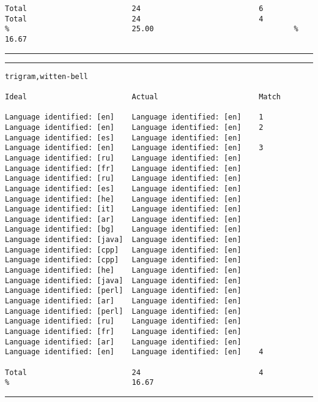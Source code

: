 \begin{verbatim}
Total                        24                           6       Total                        24                           4
%                            25.00                                %                            16.67
\end{verbatim}
\vskip4pt\hrule

\clearpage

\tiny
\hrule\vskip4pt
\begin{verbatim}
trigram,witten-bell

Ideal                        Actual                       Match

Language identified: [en]    Language identified: [en]    1
Language identified: [en]    Language identified: [en]    2
Language identified: [es]    Language identified: [en]
Language identified: [en]    Language identified: [en]    3
Language identified: [ru]    Language identified: [en]
Language identified: [fr]    Language identified: [en]
Language identified: [ru]    Language identified: [en]
Language identified: [es]    Language identified: [en]
Language identified: [he]    Language identified: [en]
Language identified: [it]    Language identified: [en]
Language identified: [ar]    Language identified: [en]
Language identified: [bg]    Language identified: [en]
Language identified: [java]  Language identified: [en]
Language identified: [cpp]   Language identified: [en]
Language identified: [cpp]   Language identified: [en]
Language identified: [he]    Language identified: [en]
Language identified: [java]  Language identified: [en]
Language identified: [perl]  Language identified: [en]
Language identified: [ar]    Language identified: [en]
Language identified: [perl]  Language identified: [en]
Language identified: [ru]    Language identified: [en]
Language identified: [fr]    Language identified: [en]
Language identified: [ar]    Language identified: [en]
Language identified: [en]    Language identified: [en]    4

Total                        24                           4
%                            16.67
\end{verbatim}
\vskip4pt\hrule

\normalsize


